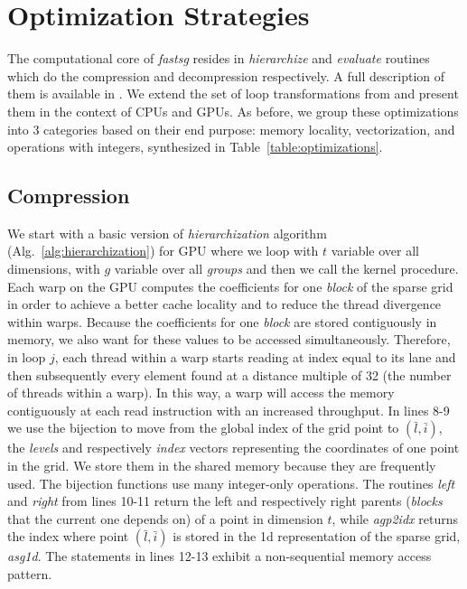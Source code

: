 \section{Optimization Strategies}
\label{sec:op_strategies}

The computational core of \textit{fastsg} resides in \textit{hierarchize} and
\textit{evaluate} routines which do the compression and decompression
respectively. A full description of them is available in
\cite{Murarasu:2011:CDS:1941553.1941559}. We extend the set of loop
transformations from \cite{murarasu12fastsg:} and present them in the context of
CPUs and GPUs. As before, we group these optimizations into 3 categories based
on their end purpose: memory locality, vectorization, and operations with
integers, synthesized in Table~\ref{table:optimizations}.

\subsection{Compression}

We start with a basic version of \textit{hierarchization} algorithm
(Alg.~\ref{alg:hierarchization}) for GPU where we loop with $t$ variable over
all dimensions, with $g$ variable over all \textit{groups} and then we call the
kernel procedure. Each warp on the GPU computes the coefficients for one
\textit{block} of the sparse grid in order to achieve a better cache locality
and to reduce the thread divergence within warps. Because the coefficients for
one \textit{block} are stored contiguously in memory, we also want for these
values to be accessed simultaneously. Therefore, in loop $j$, each thread within
a warp starts reading at index equal to its lane and then subsequently every
element found at a distance multiple of 32 (the number of threads within a
warp). In this way, a warp will access the memory contiguously at each read
instruction with an increased throughput. In lines 8-9 we use the bijection to
move from the global index of the grid point to $(\bar{l}, \bar{i})$, the
\textit{levels} and respectively \textit{index} vectors representing the
coordinates of one point in the grid. We store them in the shared memory because
they are frequently used. The bijection functions use many integer-only
operations. The routines \textit{left} and \textit{right} from lines 10-11
return the left and respectively right parents (\textit{blocks} that the current
one depends on) of a point in dimension $t$, while \textit{agp2idx} returns the
index where point $(\bar{l}, \bar{i})$ is stored in the 1d representation of the
sparse grid, \textit{asg1d}. The statements in lines 12-13 exhibit a
non-sequential memory access pattern.

